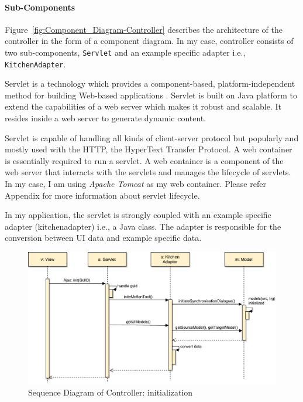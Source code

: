 \paragraph{Sub-Components}
Figure~\ref{fig:Component_Diagram-Controller} describes the architecture of the controller in the form of a component diagram. In my case, controller consists of two sub-components, \texttt{Servlet} and an example specific adapter i.e., \texttt{KitchenAdapter}.

Servlet is a technology which provides a component-based, platform-independent method for building Web-based applications \cite{servlet}. Servlet is built on Java platform to extend the capabilities of a web server which makes it robust and scalable. It resides inside a web server to generate dynamic content.

Servlet is capable of handling all kinds of client-server protocol but popularly and mostly used with the HTTP, the HyperText Transfer Protocol. A web container is essentially required to run a servlet. A web container is a component of the web server that interacts with the servlets and manages the lifecycle of servlets. In my case, I am using \textit{Apache Tomcat} as my web container. Please refer Appendix for more information about servlet lifecycle.

In my application, the servlet is strongly coupled with an example specific adapter (kitchenadapter) i.e., a Java class. The adapter is responsible for the conversion between UI data and example specific data.

\begin{figure}
	\centering
	\includegraphics[width=1\textwidth]{figures/Sequence_Diagram-Controller(init)}
	\caption{Sequence Diagram of Controller: initialization}
	\label{fig:Sequence_Diagram-Controller(init)}
\end{figure}

